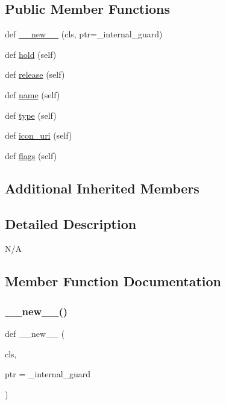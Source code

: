 \subsection*{Public Member Functions}
\begin{DoxyCompactItemize}
\item 
def \hyperlink{classvlc_1_1_renderer_a2ed91930af7622fec54ade5b2d4b2315}{\+\_\+\+\_\+new\+\_\+\+\_\+} (cls, ptr=\+\_\+internal\+\_\+guard)
\item 
def \hyperlink{classvlc_1_1_renderer_a3d005406da2434646eee68e2f7175b35}{hold} (self)
\item 
def \hyperlink{classvlc_1_1_renderer_a4cd51e19135e5ad4a19eae3ea9c60537}{release} (self)
\item 
def \hyperlink{classvlc_1_1_renderer_a5907ca3bbf8e7cd8f40c3007338f6d02}{name} (self)
\item 
def \hyperlink{classvlc_1_1_renderer_aff464267544e4efc9b770c8320c8f199}{type} (self)
\item 
def \hyperlink{classvlc_1_1_renderer_a879c6fc8fa45e9dee1502bcc1379924e}{icon\+\_\+uri} (self)
\item 
def \hyperlink{classvlc_1_1_renderer_af775bd05363da54958bd28e5dbe4a2a9}{flags} (self)
\end{DoxyCompactItemize}
\subsection*{Additional Inherited Members}


\subsection{Detailed Description}
\begin{DoxyVerb}N/A
\end{DoxyVerb}
 

\subsection{Member Function Documentation}
\mbox{\label{classvlc_1_1_renderer_a2ed91930af7622fec54ade5b2d4b2315}} 
\subsubsection{\texorpdfstring{\+\_\+\+\_\+new\+\_\+\+\_\+()}{\_\_new\_\_()}}
{\footnotesize\ttfamily def \+\_\+\+\_\+new\+\_\+\+\_\+ (\begin{DoxyParamCaption}\item[{}]{cls,  }\item[{}]{ptr = {\ttfamily \+\_\+internal\+\_\+guard} }\end{DoxyParamCaption})}

